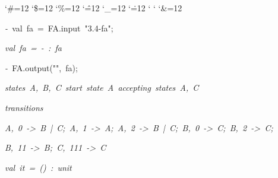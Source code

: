 \begin{list}{}
{\setlength{\leftmargin}{\leftmargini}
\setlength{\rightmargin}{0cm}
\setlength{\itemindent}{0cm}
\setlength{\listparindent}{0cm}
\setlength{\itemsep}{0cm}
\setlength{\parsep}{0cm}
\setlength{\labelsep}{0cm}
\setlength{\labelwidth}{0cm}
\catcode`\#=12
\catcode`\$=12
\catcode`\%=12
\catcode`\^=12
\catcode`\_=12
\catcode`\.=12
\catcode`
\catcode`
\catcode`\&=12
\ttfamily}
\small
\item[]\textsl{-\ }val\ fa\ =\ FA.input\ "3.4-fa";
\item[]\textsl{val\ fa\ =\ -\ :\ fa}
\item[]\textsl{-\ }FA.output("",\ fa);
\item[]\textsl{states\ A,\ B,\ C\ start\ state\ A\ accepting\ states\ A,\ C}
\item[]\textsl{transitions}
\item[]\textsl{A,\ 0\ ->\ B\ |\ C;\ A,\ 1\ ->\ A;\ A,\ 2\ ->\ B\ |\ C;\ B,\ 0\ ->\ C;\ B,\ 2\ ->\ C;}
\item[]\textsl{B,\ 11\ ->\ B;\ C,\ 111\ ->\ C}
\item[]\textsl{val\ it\ =\ ()\ :\ unit}
\end{list}
